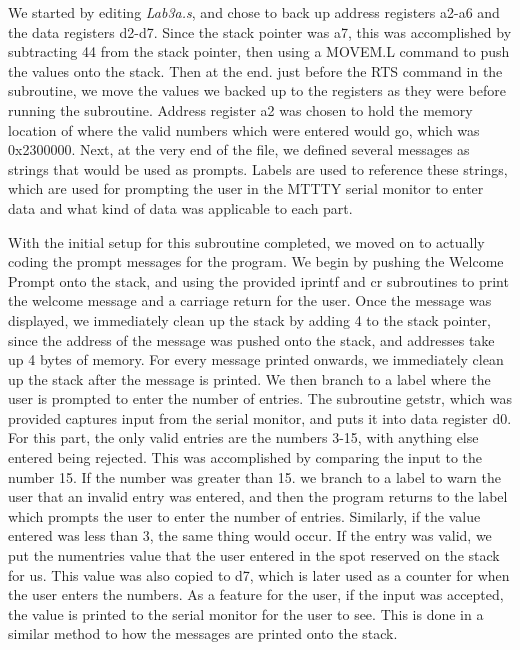 \documentclass[letterpaper]{article}
\begin{document}
    We started by editing \textit{Lab3a.s}, and chose to back up
    address registers a2-a6 and the data registers d2-d7. Since the stack pointer
    was a7, this was accomplished by subtracting 44 from the stack pointer,
    then using a MOVEM.L command to push the values onto the stack. Then at the end. just before
    the RTS command in the subroutine, we move the values we backed up to the registers
    as they were before running the subroutine. Address register a2 was chosen to
    hold the memory location of where the valid numbers which were entered would go, which
    was 0x2300000.
    Next, at the very end of the file, we
    defined several messages as strings that would be used as prompts. Labels are used to reference
    these strings, which are used for prompting the user in the MTTTY serial monitor to enter data and what kind of data was applicable to each part.

    With the initial setup for this subroutine completed, we moved on to
    actually coding the prompt messages for the program. We begin by
    pushing the Welcome Prompt onto the stack, and using the provided iprintf
    and cr subroutines to print the welcome message and a carriage return for the
    user. Once the message was displayed, we immediately clean up the stack by adding 4
    to the stack pointer, since the address of the message was pushed onto the stack,
    and addresses take up 4 bytes of memory. For every message printed onwards,
    we immediately clean up the stack after the message is printed. We then branch to a label where the user
    is prompted to enter the number of entries. The subroutine getstr, which was provided captures input from the serial monitor,
    and puts it into data register d0. For this part, the only
    valid entries are the numbers 3-15, with anything else entered being rejected.
    This was accomplished by comparing the input to the number 15. If the number was
    greater than 15. we branch to a label to warn the user that an invalid entry was entered,
    and then the program returns to the label which prompts the user to enter
    the number of entries. Similarly, if the value entered was less than 3, the same thing would occur.
    If the entry was valid, we put the numentries value that the user entered in the spot reserved on the
    stack for us. This value was also copied to d7, which is later used as a counter
    for when the user enters the numbers. As a feature for the user, if the input was
    accepted, the value is printed to the serial monitor for the user to see. This is done
    in a similar method to how the messages are printed onto the stack.
\end{document}
